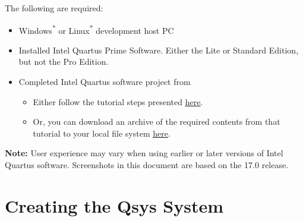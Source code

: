 \begin{flushleft}
\noindent
The following are required:

\begin{itemize}

\item Windows\textsuperscript{*} or Linux\textsuperscript{*} development host PC

\item Installed Intel Quartus Prime Software.  Either the Lite or Standard Edition, but not the Pro Edition.
\item Completed Intel Quartus software project from 
\begin{itemize}
\item Either follow the tutorial steps presented \href{\TheReleasesURL/writeup_MyFirstFPGA.pdf}{\underline{here}}.
\item Or, you can download an archive of the required contents from that tutorial to your local file system \href{\TheReleasesURL/blink_for_MyFirstQsysSystem.zip}{\underline{here}}.
\end{itemize}

\end{itemize}

\begin{tcolorbox}[
	colback=MyMintedBGColor,
	colframe=MyMintedBGColor,
	]

\textbf{Note:} User experience may vary when using earlier or later versions of Intel Quartus software.  Screenshots in this document are based on the 17.0 release.

\end{tcolorbox}

\end{flushleft}

\newpage

\section*{Creating the Qsys System}

